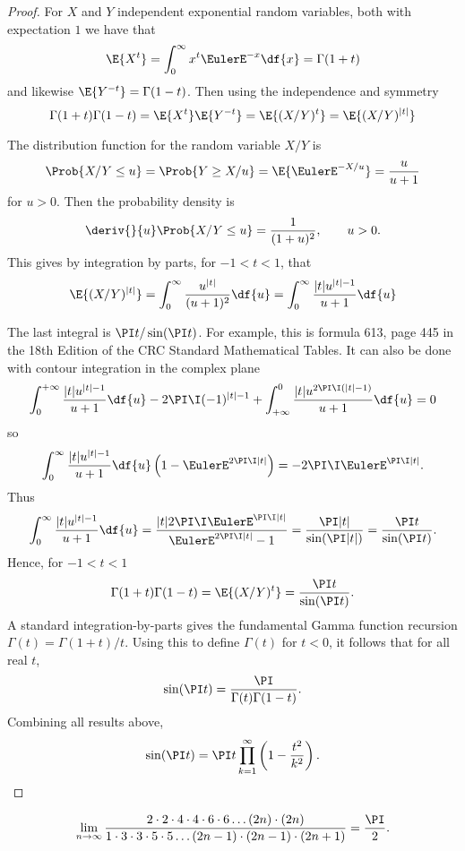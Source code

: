 \documentclass[12pt]{article}
\begin{document}
\begin{proof}
    For \( X \) and \( Y \) independent exponential random variables,
    both with expectation \( 1 \) we have that
    \[
        \E{X^t} = \int_0^\infty x^t \EulerE^{-x} \df{x} = \Gamma(1 + t)
    \] and likewise \( \E{Y^{-t}} = \Gamma(1-t) \).  Then using the
    independence and symmetry
    \[
        \Gamma(1+t)\Gamma(1-t) = \E{X^t}\E{Y^{-t}} = \E{ (X/Y)^t } = \E{%
        (X/Y)^{|t|} }
    \]

    The distribution function for the random variable \( X/Y \) is
    \[
        \Prob{ X/Y \le u } = \Prob{ Y \ge X/u } = \E{ \EulerE^{-X/u}} =
        \frac{u}{u+1}
    \] for \( u > 0 \).  Then the probability density is
    \[
        \deriv{}{u} \Prob{X/Y \le u} = \frac{1}{(1+u)^2}, \qquad u > 0.
    \] This gives by integration by parts, for \( -1 < t < 1 \), that
    \[
        \E{(X/Y)^{|t|}} = \int_{0}^{\infty} \frac{u^{|t|}}{(u+1)^2} \df{u}
        = \int_{0}^{\infty} \frac{ |t| u^{|t|-1}}{u+1} \df{u}
    \]

    The last integral is \( \PI t/\sin(\PI t) \).  For example, this is
    formula 613, page 445 in the 18th Edition of the CRC Standard
    Mathematical Tables.  It can also be done with contour integration
    in the complex plane
    \[
        \int_{0}^{+\infty} \frac{ |t| u^{|t|-1}}{u+1} \df{u} - 2\PI \I (-1)^
        {|t|-1} + \int_{+\infty}^0 \frac{ |t| u^{2\PI\I(|t|-1)}}{u+1}
        \df{u} = 0
    \] so
    \[
        \int_{0}^{\infty} \frac{ |t| u^{|t|-1}}{u+1} \df{u} \left( 1-
        \EulerE^{2\PI \I |t|} \right) = -2 \PI \I \EulerE^{\PI \I |t|}.
    \] Thus
    \[
        \int_{0}^{\infty} \frac{ |t| u^{|t|-1}}{u+1} \df{u} = \frac{|t|
        2 \PI \I \EulerE^{\PI \I |t|}}{\EulerE^{2\PI \I |t|} - 1} =
        \frac{ \PI |t| }{\sin ( \PI |t| )} = \frac{ \PI t}{\sin( \PI t)}.
    \] Hence, for \( -1 < t < 1 \)
    \[
        \Gamma(1 + t) \Gamma(1 - t) = \E{ (X/Y)^t} = \frac{ \PI t}{\sin(
        \PI t)}.
    \] A standard integration-by-parts gives the fundamental Gamma
    function recursion \( \Gamma(t) = \Gamma(1+t)/t \).  Using this to
    define \( \Gamma(t) \) for \( t < 0 \), it follows that for all real
    \( t \),
    \[
        \sin( \PI t ) = \frac{\PI}{\Gamma(t)\Gamma(1-t)}.
    \] Combining all results above,
    \[
        \sin( \PI t ) = \PI t \prod_{k=1}^{\infty} \left( 1 - \frac{t^2}
        {k^2} \right).
    \]
\end{proof}

\begin{corollary}
    \[
        \lim_{n \to \infty} \frac{ 2 \cdot 2 \cdot 4 \cdot 4 \cdot 6
        \cdot 6 \dots (2n) \cdot (2n)}{1 \cdot 3 \cdot 3 \cdot 5 \cdot 5
        \dots (2n-1) \cdot (2n-1)\cdot(2n+1)} = \frac{\PI}{2}.
    \]
\end{corollary}
\end{document}
